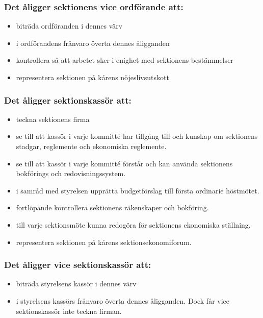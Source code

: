 \subsubsection{Det åligger sektionens vice ordförande att:}

\begin{itemize}
  \item biträda ordföranden i dennes värv 
  \item i ordförandens frånvaro överta dennes åligganden 
  \item kontrollera så att arbetet sker i enighet med sektionens bestämmelser 
  \item representera sektionen på kårens nöjeslivsutskott
\end{itemize}

\subsubsection{Det åligger sektionskassör att:}

\begin{itemize}
  \item teckna sektionens firma
  \item se till att kassör i varje kommitté har tillgång till och kunskap om sektionens stadgar, reglemente och ekonomiska reglemente.
  \item se till att kassör i varje kommitté förstår och kan använda sektionens bokförings och redovisningssystem.
  \item i samråd med styrelsen upprätta budgetförslag till första ordinarie höstmötet.
  \item fortlöpande kontrollera sektionens räkenskaper och bokföring.
  \item till varje sektionsmöte kunna redogöra för sektionens ekonomiska ställning.
  \item representera sektionen på kårens sektionsekonomiforum.
\end{itemize}

\subsubsection{Det åligger vice sektionskassör att:}

\begin{itemize}
  \item biträda styrelsens kassör i dennes värv
  \item i styrelsens kassörs frånvaro överta dennes åligganden. 
        Dock får vice sektionskassör inte teckna firman.
\end{itemize}

